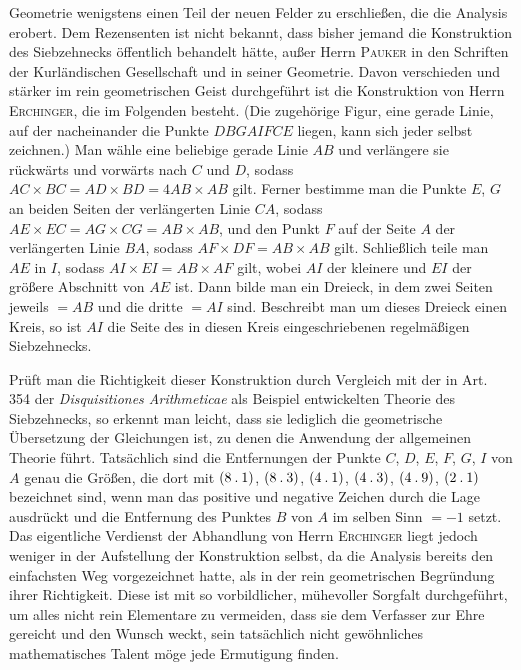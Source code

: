 Geometrie wenigstens einen Teil der neuen Felder zu erschließen, die die Analysis erobert. Dem Rezensenten ist nicht bekannt, dass bisher jemand die Konstruktion des Siebzehnecks öffentlich behandelt hätte, außer Herrn \textsc{Pauker} in den Schriften der Kurländischen Gesellschaft und in seiner Geometrie. Davon verschieden und stärker im rein geometrischen Geist durchgeführt ist die Konstruktion von Herrn \textsc{Erchinger}, die im Folgenden besteht. (Die zugehörige Figur, eine gerade Linie, auf der nacheinander die Punkte $DBGAIFCE$ liegen, kann sich jeder selbst zeichnen.) Man wähle eine beliebige gerade Linie $AB$ und verlängere sie rückwärts und vorwärts nach $C$ und $D$, sodass $AC\times BC=AD\times BD=4AB\times AB$ gilt. Ferner bestimme man die Punkte $E$, $G$ an beiden Seiten der verlängerten Linie $CA$, sodass $AE\times EC=AG\times CG=AB\times AB$, und den Punkt $F$ auf der Seite $A$ der verlängerten Linie $BA$, sodass $AF\times DF=AB\times AB$ gilt. Schließlich teile man $AE$ in $I$, sodass $AI\times EI=AB\times AF$ gilt, wobei $AI$ der kleinere und $EI$ der größere Abschnitt von $AE$ ist. Dann bilde man ein Dreieck, in dem zwei Seiten jeweils $=AB$ und die dritte $=AI$ sind. Beschreibt man um dieses Dreieck einen Kreis, so ist $AI$ die Seite des in diesen Kreis eingeschriebenen regelmäßigen Siebzehnecks.

Prüft man die Richtigkeit dieser Konstruktion durch Vergleich mit der in Art. 354 der \emph{Disquisitiones Arithmeticae} als Beispiel entwickelten Theorie des Siebzehnecks, so erkennt man leicht, dass sie lediglich die geometrische Übersetzung der Gleichungen ist, zu denen die Anwendung der allgemeinen Theorie führt. Tatsächlich sind die Entfernungen der Punkte $C$, $D$, $E$, $F$, $G$, $I$ von $A$ genau die Größen, die dort mit $(8\mathbin{.}1)$, $(8\mathbin{.}3)$, $(4\mathbin{.}1)$, $(4\mathbin{.}3)$, $(4\mathbin{.}9)$, $(2\mathbin{.}1)$ bezeichnet sind, wenn man das positive und negative Zeichen durch die Lage ausdrückt und die Entfernung des Punktes $B$ von $A$ im selben Sinn $=-1$ setzt. Das eigentliche Verdienst der Abhandlung von Herrn \textsc{Erchinger} liegt jedoch weniger in der Aufstellung der Konstruktion selbst, da die Analysis bereits den einfachsten Weg vorgezeichnet hatte, als in der rein geometrischen Begründung ihrer Richtigkeit. Diese ist mit so vorbildlicher, mühevoller Sorgfalt durchgeführt, um alles nicht rein Elementare zu vermeiden, dass sie dem Verfasser zur Ehre gereicht und den Wunsch weckt, sein tatsächlich nicht gewöhnliches mathematisches Talent möge jede Ermutigung finden.

